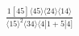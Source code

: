 \documentclass[varwidth, border=5pt]{standalone}
\begin{document}
\begin{my}
$\begin{gathered}
\scriptscriptstyle\frac{1[45]⟨45⟩⟨24⟩⟨14⟩}{⟨15⟩^2⟨34⟩⟨4|1+5|4]}
\end{gathered}$
\end{my}
\end{document}
